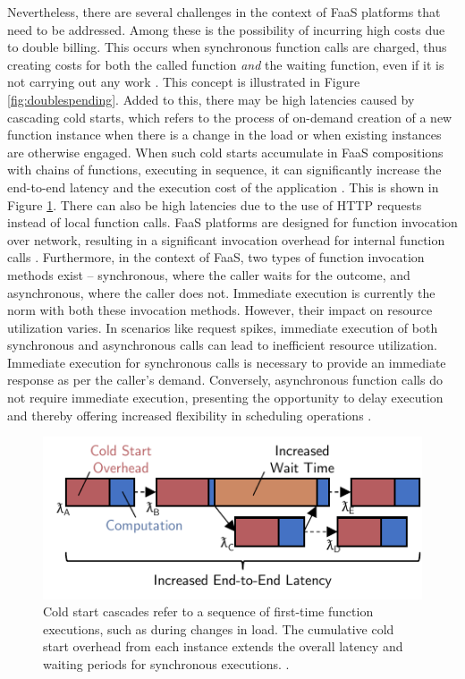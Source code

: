 Nevertheless, there are several challenges in the context of FaaS platforms that
need to be addressed. Among these is the possibility of incurring high costs due
to double billing. This occurs when synchronous function calls are charged, thus
creating costs for both the called function \emph{and} the waiting function,
even if it is not carrying out any work \cite{baldini2017serverless}. This
concept is illustrated in Figure \ref{fig:doublespending}. Added to this, there
may be high latencies caused by cascading cold starts, which refers to the
process of on-demand creation of a new function instance when there is a change
in the load or when existing instances are otherwise engaged. When such cold
starts accumulate in FaaS compositions with chains of functions, executing in
sequence, it can significantly increase the end-to-end latency and the execution
cost of the application \cite{bermbach2020using, daw2020xanadu}. This is shown
in Figure \ref{fig:cascading_cold_start}. There can also be high latencies due
to the use of HTTP requests instead of local function calls. FaaS platforms are
designed for function invocation over network, resulting in a significant
invocation overhead for internal function calls \cite{jia2021nightcore,
qi2022spright}. Furthermore, in the context of FaaS, two types of function
invocation methods exist -- synchronous, where the caller waits for the outcome,
and asynchronous, where the caller does not. Immediate execution is currently
the norm with both these invocation methods. However, their impact on resource
utilization varies. In scenarios like request spikes, immediate execution of
both synchronous and asynchronous calls can lead to inefficient resource
utilization. Immediate execution for synchronous calls is necessary to provide
an immediate response as per the caller's demand. Conversely, asynchronous
function calls do not require immediate execution, presenting the opportunity to
delay execution and thereby offering increased flexibility in scheduling
operations \cite{schirmer2023profaastinate}.

\begin{figure}
    \centering
    \includegraphics[width=.9\linewidth]{figures/cascadingcoldstart}
    \caption{
        Cold start cascades refer to a sequence of first-time function
        executions, such as during changes in load. The cumulative cold start
        overhead from each instance extends the overall latency and waiting
        periods for synchronous executions. \cite{bermbach2020using}.
    }
    \label{fig:cascading_cold_start}
\end{figure}

